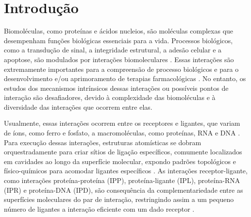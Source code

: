 \documentclass[Portugues]{phdquali}
\begin{document}
\clearpage



\tableofcontents

\fimdaspaginasiniciais



\chapter{Introdução}

Biomoléculas, como proteínas e ácidos nucleios, são moléculas complexas que desempenham funções biológicas essenciais para a vida. Processos biológicos, como a transdução de sinal, a integridade estrutural, a adesão celular e a apoptose, são modulados por interações biomoleculares \cite{sotriffer2002,henrich2010}. Essas interações são extremamente importantes para a compreensão de processo biológicos e para o desenvolvimento e/ou aprimoramento de terapias farmacológicas \cite{henrich2010}. No entanto, os estudos dos mecanismos intrínsicos dessas interações ou possíveis pontos de interação são desafiadores, devido à complexidade das biomoléculas e à diversidade das interações que ocorrem entre elas.

Usualmente, essas interações ocorrem entre os receptores e ligantes, que variam de íons, como ferro e fosfato, a macromoléculas, como proteínas, RNA e DNA \cite{oliveira2014}. Para execução dessas interações, estruturas atomísticas se dobram orquestradamente para criar sítios de ligação específicos, comumente localizados em cavidades ao longo da superfície molecular, expondo padrões topológicos e físico-químicos para acomodar ligantes específicos \cite{henrich2010,guerra2021}. As interações receptor-ligante, como interações proteína-proteína (IPP), proteína-ligante (IPL), proteína-RNA (IPR) e proteína-DNA (IPD), são consequência da complementariedade entre as superfícies moleculares do par de interação, restringindo assim a um pequeno número de ligantes a interação eficiente com um dado receptor \cite{henrich2010,simoes2017}.
\end{document}
